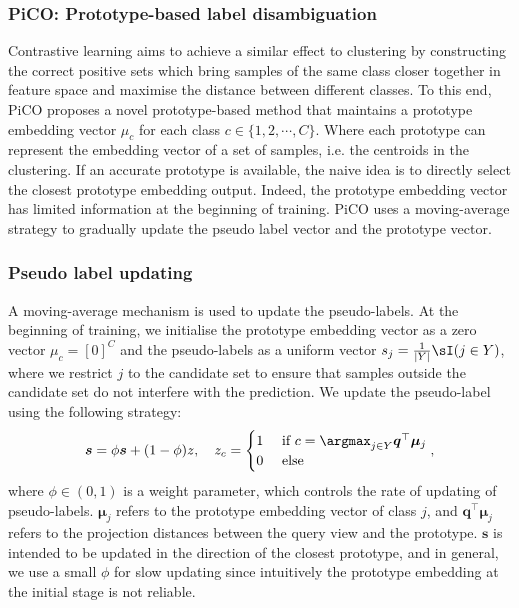 \documentclass{article} %
\begin{document}
\subsubsection{PiCO: Prototype-based label disambiguation}
Contrastive learning aims to achieve a similar effect to clustering by constructing the correct positive sets which bring samples of the same class closer together in feature space and maximise the distance between different classes.
To this end, PiCO proposes a novel prototype-based method that maintains a prototype embedding vector $\mu_c$ for each class $c \in \{1, 2, \cdots, C\}$.
Where each prototype can represent the embedding vector of a set of samples, i.e. the centroids in the clustering. 
If an accurate prototype is available, the naive idea is to directly select the closest prototype embedding output. Indeed, the prototype embedding vector has limited information at the beginning of training. PiCO uses a moving-average strategy to gradually update the pseudo label vector and the prototype vector. 
\subsubsection*{\textbf{Pseudo label updating}}
A moving-average mechanism is used to update the pseudo-labels. At the beginning of training, we initialise the prototype embedding vector as a zero vector $\mu_c = [0]^C$ and the pseudo-labels as a uniform vector $s_j = \frac{1}{|Y|} \sI (j \in Y)$,
where we restrict $j$ to the candidate set to ensure that samples outside the candidate set do not interfere with the prediction.
We update the pseudo-label using the following strategy:
\begin{equation}
    \boldsymbol{s} = \phi \boldsymbol{s} + (1 - \phi) z, ~~~ z_c = 
    \begin{cases}
        1 & \text{ if } c = \argmax_{j\in Y} \boldsymbol{q}^\top \boldsymbol{\mu}_j \\
        0 & \text{ else } 
    \end{cases},
\end{equation}
where $\phi \in (0, 1)$ is a weight parameter, which controls the rate of updating of pseudo-labels. 
$\boldsymbol{\mu}_j$ refers to the prototype embedding vector of class $j$, and $\boldsymbol{q}^\top \boldsymbol{\mu}_j$ refers to the projection distances between the query view and the prototype.
$\boldsymbol{s}$ is intended to be updated in the direction of the closest prototype, and in general, we use a small $\phi$ for slow updating since intuitively the prototype embedding at the initial stage is not reliable. 
\end{document}

